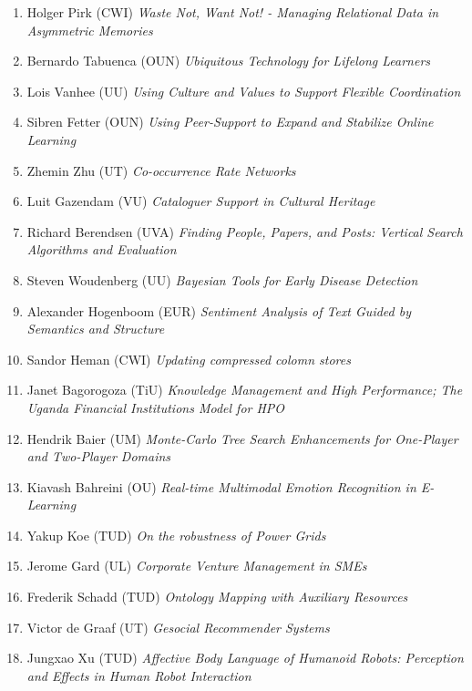 \begin{multicols}{2}
\begin{scriptsize}
\begin{enumerate}[leftmargin=*,noitemsep,topsep=0pt,parsep=1pt,partopsep=0pt]
{}\item Holger Pirk (CWI) \textit{Waste Not, Want Not! - Managing Relational Data in Asymmetric Memories
}\item Bernardo Tabuenca (OUN) \textit{Ubiquitous Technology for Lifelong Learners
}\item Lois Vanhee (UU) \textit{Using Culture and Values to Support Flexible Coordination 
}\item Sibren Fetter (OUN) \textit{Using Peer-Support to Expand and Stabilize Online Learning
}\item Zhemin Zhu (UT) \textit{Co-occurrence Rate Networks
}\item Luit Gazendam (VU) \textit{Cataloguer Support in Cultural Heritage
}\item Richard Berendsen (UVA) \textit{Finding People, Papers, and Posts: Vertical Search Algorithms and Evaluation
}\item Steven Woudenberg (UU) \textit{Bayesian Tools for Early Disease Detection 
}\item Alexander Hogenboom (EUR) \textit{Sentiment Analysis of Text Guided by Semantics and Structure
}\item Sandor Heman (CWI) \textit{Updating compressed colomn stores
}\item Janet Bagorogoza (TiU) \textit{Knowledge Management and High Performance; The Uganda Financial Institutions Model for HPO
}\item Hendrik Baier (UM) \textit{Monte-Carlo Tree Search Enhancements for One-Player and Two-Player Domains
}\item Kiavash Bahreini (OU) \textit{Real-time Multimodal Emotion Recognition in E-Learning
}\item Yakup Koe (TUD) \textit{On the robustness of Power Grids
}\item Jerome Gard (UL) \textit{Corporate Venture Management in SMEs
}\item Frederik Schadd (TUD) \textit{Ontology Mapping with Auxiliary Resources
}\item Victor de Graaf (UT) \textit{Gesocial Recommender Systems
}\item Jungxao Xu (TUD) \textit{Affective Body Language of Humanoid Robots: Perception and Effects in Human Robot Interaction}
\end{enumerate}


\end{scriptsize}
\end{multicols}
